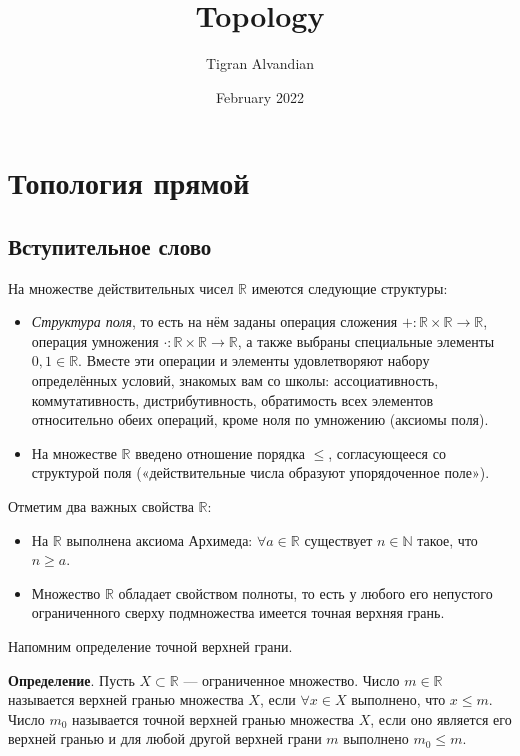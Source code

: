 \documentclass{report}
\title{Topology}
\author{Tigran Alvandian}
\date{February 2022}
\begin{document}
\maketitle 

\chapter{Топология прямой}
\section{Вступительное слово}


На множестве действительных чисел $\mathbb{R}$  имеются следующие структуры: \\ 
\begin{itemize}

\item \textit{Структура поля}, то есть на нём заданы операция сложения $+ \colon \mathbb{R} \times \mathbb{R} \to \mathbb{R}$, операция умножения $\cdot: \mathbb{R} \times \mathbb{R} \to \mathbb{R}$, а также выбраны специальные элементы $0, 1 \in \mathbb{R}$. Вместе эти операции и элементы удовлетворяют набору определённых условий, знакомых вам со школы: ассоциативность, коммутативность, дистрибутивность, обратимость всех элементов относительно обеих операций, кроме ноля по умножению (аксиомы поля).\\
\item На множестве $\mathbb{R}$ введено отношение порядка $\leqslant$, согласующееся со структурой поля («действительные числа образуют упорядоченное поле»). \\
\end{itemize}
Отметим два важных свойства $\mathbb{R}$: \\ 

\begin{itemize}
\item На $\mathbb{R}$ выполнена аксиома Архимеда: $\forall a \in \mathbb{R}$ существует $n \in \mathbb{N}$ такое, что $n \geq a$. \\
\item Множество $\mathbb{R}$ обладает свойством полноты, то есть у любого его непустого ограниченного сверху подмножества имеется точная верхняя грань. \\
\end{itemize}

Напомним определение точной верхней грани.

\textbf{Определение}. Пусть $X \subset \mathbb{R}$ — ограниченное множество. Число $m \in \mathbb{R}$ называется верхней гранью множества $X$, если $\forall x \in X$ выполнено, что $x \leq m$. Число $m_0$ называется точной верхней гранью множества $X$, если оно является его верхней гранью и для любой другой верхней грани $m$ выполнено $m_0 \leq m$. \\ 
\end{document}
